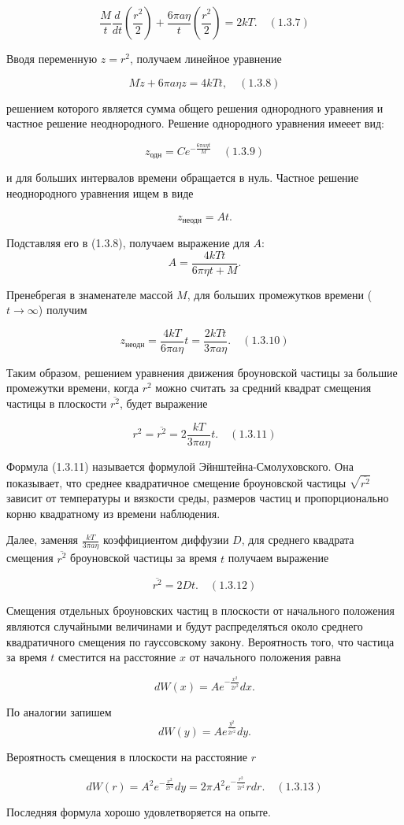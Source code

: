 $$\frac{M}{t}\frac{d}{dt}\left(\frac{r^2}{2}\right) + \frac{6\pi a\eta}{t}\left(\frac{r^2}{2}\right) =2kT. \quad (1.3.7)$$

Вводя переменную $z=r^2$, получаем линейное уравнение

$$M\dot{z} + 6 \pi a \eta z = 4kTt, \quad (1.3.8) $$

решением которого является сумма общего решения однородного уравнения и частное решение неоднородного. Решение однородного уравнения имееет вид:

$$z_{\text{одн}} = Ce^{-\frac{6\pi a \eta t}{M}} \quad (1.3.9)$$

и для больших интервалов времени обращается в нуль. Частное решение неоднородного уравнения ищем в виде

$$z_{\text{неодн}}=At.$$

Подставляя его в (1.3.8), получаем выражение для $A$:
$$A = \frac{4kTt}{6\pi \eta t + M} .$$

Пренебрегая в знаменателе массой $M$, для больших промежутков времени ($t  \rightarrow \infty$) получим

$$z_{\text{неодн}}=\frac{4kT}{6 \pi a \eta}t=\frac{2kTt}{3 \pi a \eta}. \quad (1.3.10)$$

Таким образом, решением уравнения движения броуновской частицы за большие промежутки времени, когда $r^2$ можно считать за средний квадрат смещения частицы в плоскости $\overline{r^2}$, будет выражение

$$r^2 = \overline{r^2}=2\frac{kT}{3 \pi a \eta}t. \quad (1.3.11)
$$

Формула (1.3.11) называется формулой Эйнштейна-Смолуховского. Она показывает, что среднее квадратичное смещение броуновской частицы $\sqrt{\overline{r^2}}$ зависит от температуры и вязкости среды, размеров частиц и пропорционально корню квадратному из времени наблюдения.

Далее, заменяя $\frac{kT}{3 \pi a \eta}$ коэффициентом диффузии $D$, для среднего квадрата смещения $\overline{r^2}$ броуновской частицы за время $t$  получаем выражение

$$\overline{r^2}=2Dt. \quad (1.3.12)$$

Смещения отдельных броуновских частиц в плоскости от начального положения являются случайными величинами и будут распределяться около среднего квадратичного смещения по гауссовскому закону. Вероятность того, что частица за время $t$ сместится на расстояние $x$ от начального положения равна

$$dW(x)=Ae^{-\frac{x^2}{2\overline{r^2}}}dx.$$

По аналогии запишем
$$dW(y)=Ae^{\frac{y^2}{2\overline{r^2}}}dy.$$

Вероятность смещения в плоскости на расстояние $r$

$$dW(r)=A^2e^{-\frac{x^2}{2r^2}}dy=2 \pi A^2e^{-\frac{r^2}{2\overline{r^2}}}rdr. \quad (1.3.13)$$

Последняя формула хорошо удовлетворяется на опыте.
